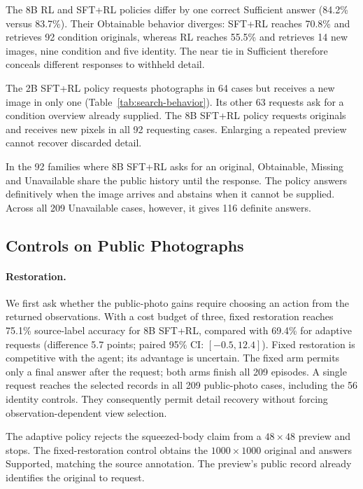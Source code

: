 \documentclass[10pt,twocolumn,letterpaper]{article}
\begin{document}
The 8B RL and SFT+RL policies differ by one correct Sufficient answer (84.2\% versus 83.7\%).
Their Obtainable behavior diverges: SFT+RL reaches 70.8\% and retrieves 92 condition originals, whereas RL reaches 55.5\% and retrieves 14 new images, nine condition and five identity.
The near tie in Sufficient therefore conceals different responses to withheld detail.



The 2B SFT+RL policy requests photographs in 64 cases but receives a new image in only one (Table~\ref{tab:search-behavior}).
Its other 63 requests ask for a condition overview already supplied.
The 8B SFT+RL policy requests originals and receives new pixels in all 92 requesting cases.
Enlarging a repeated preview cannot recover discarded detail.

In the 92 families where 8B SFT+RL asks for an original, Obtainable, Missing and Unavailable share the public history until the response.
The policy answers definitively when the image arrives and abstains when it cannot be supplied.
Across all 209 Unavailable cases, however, it gives 116 definite answers.

\subsection{Controls on Public Photographs}

\paragraph{Restoration.}
We first ask whether the public-photo gains require choosing an action from the returned observations.
With a cost budget of three, fixed restoration reaches 75.1\% source-label accuracy for 8B SFT+RL, compared with 69.4\% for adaptive requests (difference 5.7 points; paired 95\% CI: $[-0.5,12.4]$).
Fixed restoration is competitive with the agent; its advantage is uncertain.
The fixed arm permits only a final answer after the request; both arms finish all 209 episodes.
A single request reaches the selected records in all 209 public-photo cases, including the 56 identity controls.
They consequently permit detail recovery without forcing observation-dependent view selection.

The adaptive policy rejects the squeezed-body claim from a $48\!\times\!48$ preview and stops.
The fixed-restoration control obtains the $1000\!\times\!1000$ original and answers Supported, matching the source annotation.
The preview's public record already identifies the original to request.
\end{document}
